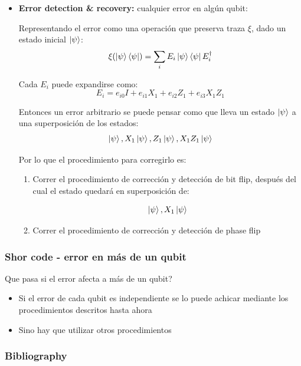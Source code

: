 \documentclass[10pt]{beamer}
\theoremstyle{remark}
\theoremstyle{definition}
\begin{document}
\begin{frame}[allowframebreaks]
    \framebreak

    \begin{itemize}
        \item \textbf{Error detection \& recovery:} cualquier error en algún qubit:
    
        \vspace{0.2cm}

        Representando el error como una operación que preserva traza $\xi$, dado un estado inicial $\ket{\psi}$:
        \[
            \xi(\ket{\psi}\bra{\psi}) = \sum_i{E_i\ket{\psi}\bra{\psi}E_i^{\dag}}
        \]

        Cada $E_i$ puede expandirse como:
        \[
            E_i = e_{i0}I + e_{i1}X_1 + e_{i2}Z_1 + e_{i3}X_1Z_1
        \]
        
        \framebreak

        Entonces un error arbitrario se puede pensar como que lleva un estado $\ket{\psi}$ a una superposición de los estados:
        \[
            \ket{\psi}, X_1\ket{\psi}, Z_1\ket{\psi}, X_1Z_1\ket{\psi}
        \]

        Por lo que el procedimiento para corregirlo es:

        \begin{enumerate}
            \item Correr el procedimiento de corrección y detección de bit flip, después del cual el estado quedará en superposición de:
            
            \[
                \ket{\psi}, X_1\ket{\psi}
            \]

            \item Correr el procedimiento de corrección y detección de phase flip
        \end{enumerate}
    \end{itemize}
\end{frame}

\begin{frame}[allowframebreaks]
    \frametitle{Shor code - error en más de un qubit}

    Que pasa si el error afecta a más de un qubit?

    \begin{itemize}
        \item Si el error de cada qubit es independiente se lo puede achicar mediante los procedimientos descritos hasta ahora
        \item Sino hay que utilizar otros procedimientos
    \end{itemize}

\end{frame}

\begin{frame}[allowframebreaks]
    \frametitle{Bibliography}

    \nocite{*}
    \printbibliography
\end{frame}
\end{document}
